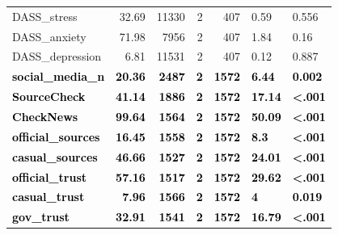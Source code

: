\documentclass[]{article}
\begin{document}
\begin{table}[H]
\begin{tabular}[t]{lrrrrll}
DASS\_stress & 32.69 & 11330 & 2 & 407 & 0.59 & 0.556\\
\addlinespace
DASS\_anxiety & 71.98 & 7956 & 2 & 407 & 1.84 & 0.16\\
DASS\_depression & 6.81 & 11531 & 2 & 407 & 0.12 & 0.887\\
\textcolor{black}{\textbf{social\_media\_n}} & \textcolor{black}{\textbf{20.36}} & \textcolor{black}{\textbf{2487}} & \textcolor{black}{\textbf{2}} & \textcolor{black}{\textbf{1572}} & \textcolor{black}{\textbf{6.44}} & \textcolor{black}{\textbf{0.002}}\\
\textcolor{black}{\textbf{SourceCheck}} & \textcolor{black}{\textbf{41.14}} & \textcolor{black}{\textbf{1886}} & \textcolor{black}{\textbf{2}} & \textcolor{black}{\textbf{1572}} & \textcolor{black}{\textbf{17.14}} & \textcolor{black}{\textbf{<.001}}\\
\textcolor{black}{\textbf{CheckNews}} & \textcolor{black}{\textbf{99.64}} & \textcolor{black}{\textbf{1564}} & \textcolor{black}{\textbf{2}} & \textcolor{black}{\textbf{1572}} & \textcolor{black}{\textbf{50.09}} & \textcolor{black}{\textbf{<.001}}\\
\addlinespace
\textcolor{black}{\textbf{official\_sources}} & \textcolor{black}{\textbf{16.45}} & \textcolor{black}{\textbf{1558}} & \textcolor{black}{\textbf{2}} & \textcolor{black}{\textbf{1572}} & \textcolor{black}{\textbf{8.3}} & \textcolor{black}{\textbf{<.001}}\\
\textcolor{black}{\textbf{casual\_sources}} & \textcolor{black}{\textbf{46.66}} & \textcolor{black}{\textbf{1527}} & \textcolor{black}{\textbf{2}} & \textcolor{black}{\textbf{1572}} & \textcolor{black}{\textbf{24.01}} & \textcolor{black}{\textbf{<.001}}\\
\textcolor{black}{\textbf{official\_trust}} & \textcolor{black}{\textbf{57.16}} & \textcolor{black}{\textbf{1517}} & \textcolor{black}{\textbf{2}} & \textcolor{black}{\textbf{1572}} & \textcolor{black}{\textbf{29.62}} & \textcolor{black}{\textbf{<.001}}\\
\textcolor{black}{\textbf{casual\_trust}} & \textcolor{black}{\textbf{7.96}} & \textcolor{black}{\textbf{1566}} & \textcolor{black}{\textbf{2}} & \textcolor{black}{\textbf{1572}} & \textcolor{black}{\textbf{4}} & \textcolor{black}{\textbf{0.019}}\\
\textcolor{black}{\textbf{gov\_trust}} & \textcolor{black}{\textbf{32.91}} & \textcolor{black}{\textbf{1541}} & \textcolor{black}{\textbf{2}} & \textcolor{black}{\textbf{1572}} & \textcolor{black}{\textbf{16.79}} & \textcolor{black}{\textbf{<.001}}\\

\end{tabular}
\end{table}
\end{document}
